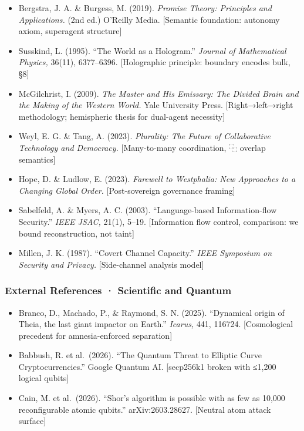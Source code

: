 \documentclass[
]{article}
\providecommand{\tightlist}{%
  \setlength{\itemsep}{0pt}\setlength{\parskip}{0pt}}
\begin{document}
\begin{itemize}
\tightlist
\item
  Bergstra, J. A. \& Burgess, M. (2019). \emph{Promise Theory:
  Principles and Applications.} (2nd ed.) O'Reilly Media. {[}Semantic
  foundation: autonomy axiom, superagent structure{]}
\item
  Susskind, L. (1995). ``The World as a Hologram.'' \emph{Journal of
  Mathematical Physics,} 36(11), 6377--6396. {[}Holographic principle:
  boundary encodes bulk, §8{]}
\item
  McGilchrist, I. (2009). \emph{The Master and His Emissary: The Divided
  Brain and the Making of the Western World.} Yale University Press.
  {[}Right→left→right methodology; hemispheric thesis for dual-agent
  necessity{]}
\item
  Weyl, E. G. \& Tang, A. (2023). \emph{Plurality: The Future of
  Collaborative Technology and Democracy.} {[}Many-to-many coordination,
  ⿻ overlap semantics{]}
\item
  Hope, D. \& Ludlow, E. (2023). \emph{Farewell to Westphalia: New
  Approaches to a Changing Global Order.} {[}Post-sovereign governance
  framing{]}
\item
  Sabelfeld, A. \& Myers, A. C. (2003). ``Language-based
  Information-flow Security.'' \emph{IEEE JSAC,} 21(1), 5--19.
  {[}Information flow control, comparison: we bound reconstruction, not
  taint{]}
\item
  Millen, J. K. (1987). ``Covert Channel Capacity.'' \emph{IEEE
  Symposium on Security and Privacy.} {[}Side-channel analysis model{]}
\end{itemize}

\subsubsection{External References · Scientific and
Quantum}\label{external-references-scientific-and-quantum}

\begin{itemize}
\tightlist
\item
  Branco, D., Machado, P., \& Raymond, S. N. (2025). ``Dynamical origin
  of Theia, the last giant impactor on Earth.'' \emph{Icarus,} 441,
  116724. {[}Cosmological precedent for amnesia-enforced separation{]}
\item
  Babbush, R. et al.~(2026). ``The Quantum Threat to Elliptic Curve
  Cryptocurrencies.'' Google Quantum AI. {[}secp256k1 broken with ≤1,200
  logical qubits{]}
\item
  Cain, M. et al.~(2026). ``Shor's algorithm is possible with as few as
  10,000 reconfigurable atomic qubits.'' arXiv:2603.28627. {[}Neutral
  atom attack surface{]}
\end{itemize}
\end{document}
